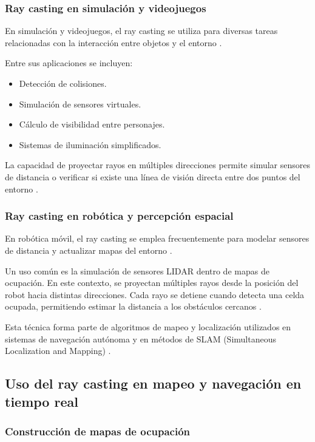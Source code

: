 \subsubsection{Ray casting en simulación y videojuegos}

En simulación y videojuegos, el ray casting se utiliza para diversas tareas relacionadas con la interacción entre objetos y el entorno \cite{wikipedia_wolfenstein}.

Entre sus aplicaciones se incluyen:

\begin{itemize}
\item Detección de colisiones.
\item Simulación de sensores virtuales.
\item Cálculo de visibilidad entre personajes.
\item Sistemas de iluminación simplificados.
\end{itemize}

La capacidad de proyectar rayos en múltiples direcciones permite simular sensores de distancia o verificar si existe una línea de visión directa entre dos puntos del entorno \cite{stackoverflow_raycasting}.

\subsubsection{Ray casting en robótica y percepción espacial}

En robótica móvil, el ray casting se emplea frecuentemente para modelar sensores de distancia y actualizar mapas del entorno \cite{elfes1989}.

Un uso común es la simulación de sensores LIDAR dentro de mapas de ocupación. En este contexto, se proyectan múltiples rayos desde la posición del robot hacia distintas direcciones. Cada rayo se detiene cuando detecta una celda ocupada, permitiendo estimar la distancia a los obstáculos cercanos \cite{elfes1989}.

Esta técnica forma parte de algoritmos de mapeo y localización utilizados en sistemas de navegación autónoma y en métodos de SLAM (Simultaneous Localization and Mapping) \cite{wikipedia_slam}.

\subsection{Uso del ray casting en mapeo y navegación en tiempo real}

\subsubsection{Construcción de mapas de ocupación}

